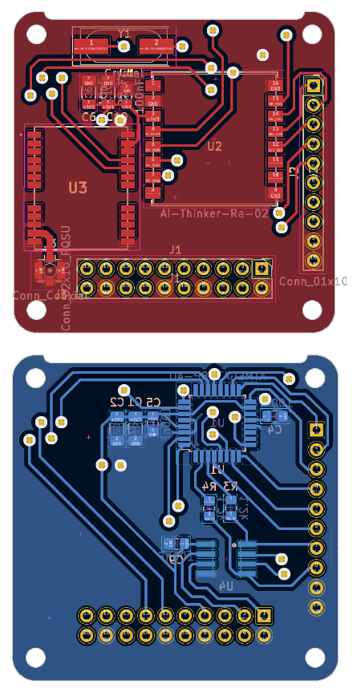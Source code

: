 \begin{figure}[!htb]
  \centering
  \begin{minipage}{.43\textwidth}
    \centering
    \includegraphics[width=.95\linewidth]{pqunit_pcb_design_front}
    \label{fig:pqunit_pcb_design_front}
  \end{minipage}
  \begin{minipage}{.43\textwidth}
    \centering
    \includegraphics[width=.95\linewidth]{pqunit_pcb_design_back}
    \label{fig:pqunit_pcb_design_back}
  \end{minipage}
  \end{figure}